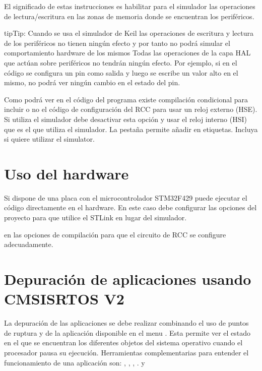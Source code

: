 \documentclass[letterpaper,10pt,english]{sphinxmanual}
\begin{document}
\sphinxAtStartPar
El significado de estas instrucciones es habilitar para el simulador las operaciones de lectura/escritura en las zonas de memoria donde se encuentran los periféricos.

\begin{sphinxadmonition}{tip}{Tip:}
\sphinxAtStartPar
Cuando se usa el simulador de Keil las operaciones de escritura y lectura de los periféricos no tienen ningún efecto y por tanto no podrá simular el comportamiento hardware de los mismos
Todas las operaciones de la capa HAL que actúan sobre periféricos no tendrán ningún efecto. Por ejemplo, si en el código se configura un pin como salida y luego se escribe un valor alto en el mismo, no podrá ver ningún cambio en el estado del pin.
\end{sphinxadmonition}

\sphinxAtStartPar
Como podrá ver en el código del programa  existe compilación condicional para incluir o no el código de configuración del RCC para usar un reloj externo (HSE).
Si utiliza el simulador debe desactivar esta opción y usar el reloj interno (HSI) que es el que utiliza el simulador. La pestaña  permite añadir en  etiquetas. Incluya  si quiere utilizar el simulator.


\section{Uso del hardware}
\label{\detokenize{cmsis-rtos:uso-del-hardware}}
\sphinxAtStartPar
Si dispone de una placa con el microcontrolador STM32F429 puede ejecutar el código directamente en el hardware. En este caso debe configurar las opciones del proyecto para que utilice el ST\sphinxhyphen{}Link en lugar del simulador.

\sphinxAtStartPar
{}  en las opciones de compilación para que el circuito de RCC se configure adecuadamente.


\section{Depuración de aplicaciones usando CMSIS\sphinxhyphen{}RTOS V2}
\label{\detokenize{cmsis-rtos:depuracion-de-aplicaciones-usando-cmsis-rtos-v2}}
\sphinxAtStartPar
La depuración de las aplicaciones se debe realizar combinando el uso de puntos de ruptura y de la aplicación  disponible en el menu .
Esta permite ver el estado en el que se encuentran los diferentes objetos del sistema operativo cuando el procesador pausa su ejecución. Herramientas complementarias para entender
el funcionamiento de una aplicación son: , , , .  y 
\end{document}
